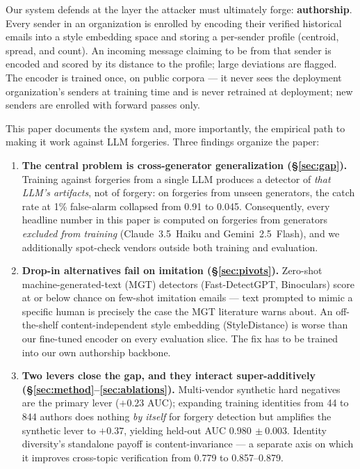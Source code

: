 \documentclass[11pt]{article}
\newcommand{\ms}[2]{\ensuremath{#1{\scriptstyle\,\pm #2}}}
\begin{document}
Our system defends at the layer the attacker must ultimately forge: \textbf{authorship}. Every
sender in an organization is enrolled by encoding their verified historical emails into a style
embedding space and storing a per-sender profile (centroid, spread, and count). An incoming message
claiming to be from that sender is encoded and scored by its distance to the profile; large
deviations are flagged. The encoder is trained once, on public corpora --- it never sees the deployment
organization's senders at training time and is never retrained at deployment; new senders are
enrolled with forward passes only.

This paper documents the system and, more importantly, the empirical path to making it work against
LLM forgeries. Three findings organize the paper:

\begin{enumerate}[leftmargin=2em]
\item \textbf{The central problem is cross-generator generalization
      (\S\ref{sec:gap}).} Training against forgeries from a single LLM produces a detector of
      \emph{that LLM's artifacts}, not of forgery: on forgeries from unseen generators, the catch
      rate at 1\% false-alarm collapsed from 0.91 to 0.045. Consequently, every headline number in
      this paper is computed on forgeries from generators \emph{excluded from training}
      (Claude~3.5~Haiku and Gemini~2.5~Flash), and we additionally spot-check vendors outside both
      training and evaluation.
\item \textbf{Drop-in alternatives fail on imitation (\S\ref{sec:pivots}).} Zero-shot
      machine-generated-text (MGT) detectors (Fast-DetectGPT, Binoculars) score at or below chance
      on few-shot imitation emails --- text prompted to mimic a specific human is precisely the case
      the MGT literature warns about. An off-the-shelf content-independent style embedding
      (StyleDistance) is worse than our fine-tuned encoder on every evaluation slice. The fix has
      to be trained into our own authorship backbone.
\item \textbf{Two levers close the gap, and they interact super-additively
      (\S\ref{sec:method}--\ref{sec:ablations}).} Multi-vendor synthetic hard negatives are the
      primary lever ($+0.23$ AUC); expanding training identities from 44 to 844 authors does
      nothing \emph{by itself} for forgery detection but amplifies the synthetic lever to $+0.37$,
      yielding held-out AUC \ms{0.980}{0.003}. Identity diversity's standalone payoff is
      content-invariance --- a separate axis on which it improves cross-topic verification from
      0.779 to 0.857--0.879.
\end{enumerate}
\end{document}

